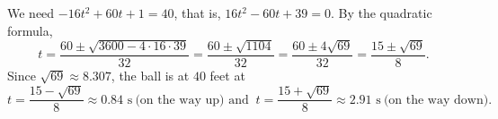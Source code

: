 We need $-16t^2+60t+1=40$, that is, $16t^2-60t+39=0$. By the quadratic formula,
\[t=\dfrac{60\pm\sqrt{3600-4\cdot16\cdot39}}{32}=\dfrac{60\pm\sqrt{1104}}{32}=\dfrac{60\pm4\sqrt{69}}{32}=\dfrac{15\pm\sqrt{69}}{8}.\]
Since $\sqrt{69}\approx8.307$, the ball is at $40$ feet at
\[t=\boxed{\dfrac{15-\sqrt{69}}{8}\approx0.84\text{ s}}\ \text{(on the way up) and }\ t=\boxed{\dfrac{15+\sqrt{69}}{8}\approx2.91\text{ s}}\ \text{(on the way down)}.\]
